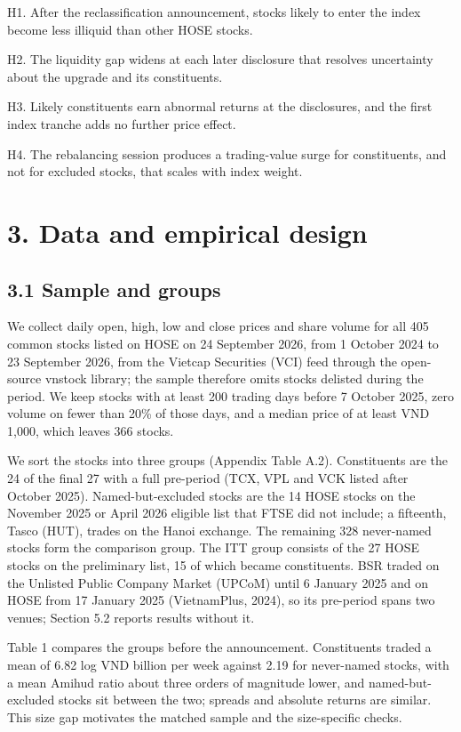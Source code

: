 \documentclass[review,authoryear,12pt]{elsarticle}
\begin{document}
H1. After the reclassification announcement, stocks likely to enter the
index become less illiquid than other HOSE stocks.

H2. The liquidity gap widens at each later disclosure that resolves
uncertainty about the upgrade and its constituents.

H3. Likely constituents earn abnormal returns at the disclosures, and
the first index tranche adds no further price effect.

H4. The rebalancing session produces a trading-value surge for
constituents, and not for excluded stocks, that scales with index
weight.

\hypertarget{data-and-empirical-design}{%
\section*{3. Data and empirical design}}

\hypertarget{sample-and-groups}{%
\subsection*{3.1 Sample and groups}}

We collect daily open, high, low and close prices and share volume for
all 405 common stocks listed on HOSE on 24 September 2026, from 1
October 2024 to 23 September 2026, from the Vietcap Securities (VCI)
feed through the open-source vnstock library; the sample therefore omits
stocks delisted during the period. We keep stocks with at least 200
trading days before 7 October 2025, zero volume on fewer than 20\% of
those days, and a median price of at least VND 1,000, which leaves 366
stocks.

We sort the stocks into three groups (Appendix Table A.2). Constituents
are the 24 of the final 27 with a full pre-period (TCX, VPL and VCK
listed after October 2025). Named-but-excluded stocks are the 14 HOSE
stocks on the November 2025 or April 2026 eligible list that FTSE did
not include; a fifteenth, Tasco (HUT), trades on the Hanoi exchange. The
remaining 328 never-named stocks form the comparison group. The ITT
group consists of the 27 HOSE stocks on the preliminary list, 15 of
which became constituents. BSR traded on the Unlisted Public Company
Market (UPCoM) until 6 January 2025 and on HOSE from 17 January 2025
(VietnamPlus, 2024), so its pre-period spans two venues; Section 5.2
reports results without it.

Table 1 compares the groups before the announcement. Constituents traded
a mean of 6.82 log VND billion per week against 2.19 for never-named
stocks, with a mean Amihud ratio about three orders of magnitude lower,
and named-but-excluded stocks sit between the two; spreads and absolute
returns are similar. This size gap motivates the matched sample and the
size-specific checks.
\end{document}
